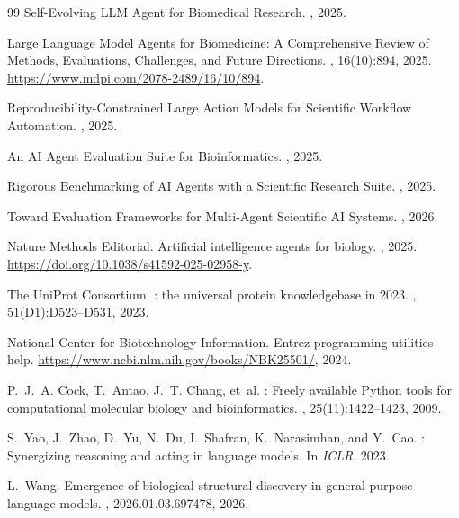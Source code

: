 \documentclass[11pt,letterpaper]{article}
\begin{document}
\begin{thebibliography}{99}
Self-Evolving {LLM} Agent for Biomedical Research.
, 2025.

Large Language Model Agents for Biomedicine: A Comprehensive Review of Methods, Evaluations, Challenges, and Future Directions.
, 16(10):894, 2025.
\newblock \url{https://www.mdpi.com/2078-2489/16/10/894}.

Reproducibility-Constrained Large Action Models for Scientific Workflow Automation.
, 2025.

An {AI} Agent Evaluation Suite for Bioinformatics.
, 2025.

Rigorous Benchmarking of {AI} Agents with a Scientific Research Suite.
, 2025.

Toward Evaluation Frameworks for Multi-Agent Scientific {AI} Systems.
, 2026.

Nature Methods Editorial.
\newblock Artificial intelligence agents for biology.
, 2025.
\newblock \url{https://doi.org/10.1038/s41592-025-02958-y}.

{The UniProt Consortium}.
: the universal protein knowledgebase in 2023.
, 51(D1):D523--D531, 2023.

{National Center for Biotechnology Information}.
\newblock Entrez programming utilities help.
\newblock \url{https://www.ncbi.nlm.nih.gov/books/NBK25501/}, 2024.

P.~J.~A. Cock, T.~Antao, J.~T. Chang, et~al.
: Freely available {Python} tools for computational
  molecular biology and bioinformatics.
, 25(11):1422--1423, 2009.

S.~Yao, J.~Zhao, D.~Yu, N.~Du, I.~Shafran, K.~Narasimhan, and Y.~Cao.
: Synergizing reasoning and acting in language models.
\newblock In {\em ICLR}, 2023.

L.~Wang.
\newblock Emergence of biological structural discovery in general-purpose
  language models.
, 2026.01.03.697478, 2026.

\end{thebibliography}
\end{document}
